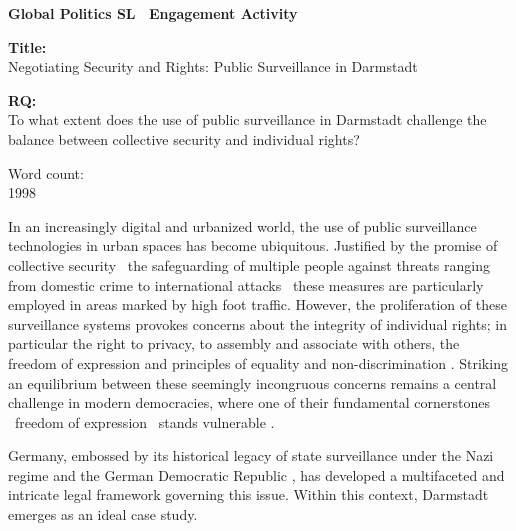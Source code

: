 \documentclass[12pt]{article}
\begin{document}
	
	\begin{titlepage}
		\centering
		
		\textbf{Global Politics SL \textemdash\ Engagement Activity}
		
		\vspace*{4cm}
		
		\textbf{Title:}\\
		Negotiating Security and Rights: Public Surveillance in Darmstadt
		
		\vspace{1cm}
		
		\textbf{RQ:}\\
		To what extent does the use of public surveillance in Darmstadt challenge the balance between collective security and individual rights?
		
		\vspace{4cm}
		
		Word count:\\
		1998
		
		\vfill
	\end{titlepage}
	
	
	In an increasingly digital and urbanized world, the use of public surveillance technologies in urban spaces has become ubiquitous. Justified by the promise of collective security \textemdash\ the safeguarding of multiple people against threats ranging from domestic crime to international attacks \parencites{noauthor_security_2025}{noauthor_collective_2025} \textemdash\ these measures are particularly employed in areas marked by high foot traffic. However, the proliferation of these surveillance systems provokes concerns about the integrity of individual rights; in particular the right to privacy, to assembly and associate with others, the freedom of expression and principles of equality and non-discrimination \parencite{nandy2023}. Striking an equilibrium between these seemingly incongruous concerns remains a central challenge in modern democracies, where one of their fundamental cornerstones \textemdash\ freedom of expression \textemdash\ stands vulnerable \parencite{noauthor_special_nodate}. 
		
	Germany, embossed by its historical legacy of state surveillance under the Nazi regime \parencite{mdrde_uberwachung_nodate} and the German Democratic Republic \parencite{lichter_loeffler_siegloch2016}, has developed a multifaceted and intricate legal framework governing this issue. Within this context, Darmstadt emerges as an ideal case study.
	
\end{document}
